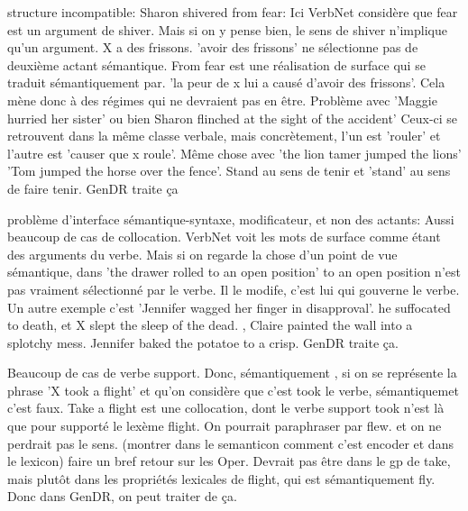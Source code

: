 structure incompatible: Sharon shivered from fear: Ici VerbNet considère que fear est un argument de shiver. Mais si on y pense bien, le sens de shiver n'implique qu'un argument. X a des frissons. 'avoir des frissons' ne sélectionne pas de deuxième actant sémantique. From fear est une réalisation de surface qui se traduit sémantiquement par. 'la peur de x lui a causé d'avoir des frissons'. Cela mène donc à des régimes qui ne devraient pas en être. Problème avec 'Maggie hurried her sister' ou bien Sharon flinched at the sight of the accident'
 Ceux-ci se retrouvent dans la même classe verbale, mais concrètement, l'un est 'rouler' et l'autre est 'causer que x roule'. Même chose avec 'the lion tamer jumped the lions' 'Tom jumped the horse over the fence'. Stand au sens de tenir et 'stand' au sens de faire tenir. GenDR traite ça

problème d'interface sémantique-syntaxe, modificateur, et non des actants: Aussi beaucoup de cas de collocation. VerbNet voit les mots de surface comme étant des arguments du verbe. Mais si on regarde la chose d'un point de vue sémantique, 	dans 'the drawer rolled to an open position' to an open position n'est pas vraiment sélectionné par le verbe. Il le modife, c'est lui qui gouverne le verbe. Un autre exemple c'est 'Jennifer wagged her finger in disapproval'. he suffocated to death, et X slept the sleep of the dead. , Claire painted the wall into a splotchy mess. Jennifer baked the potatoe to a crisp. GenDR traite ça.

Beaucoup de cas de verbe support. Donc, sémantiquement , si on se représente la phrase 'X took a flight' et qu'on considère que c'est took le verbe, sémantiquemet c'est faux. Take a flight est une collocation, dont le verbe support took n'est là que pour supporté le lexème flight. On pourrait paraphraser par flew. et on ne perdrait pas le sens. (montrer dans le semanticon comment c'est encoder et dans le lexicon) faire un bref retour sur les Oper. Devrait pas être dans le gp de take, mais plutôt dans les propriétés lexicales de flight, qui est sémantiquement fly. Donc dans GenDR, on peut traiter de ça.
 
